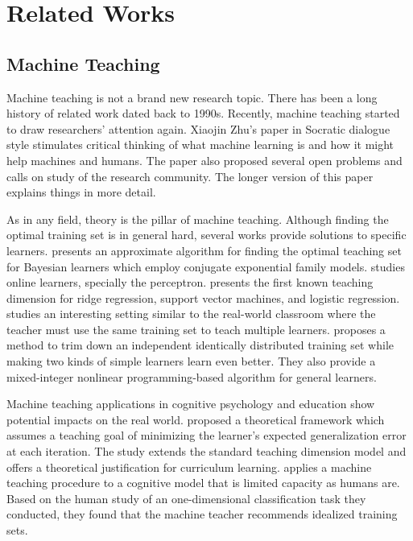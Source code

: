 
\chapter{Related Works}
\label{chap:related}


\section{Machine Teaching}

    Machine teaching is not a brand new research topic.
    There has been a long history of related work dated back to 1990s.
    Recently, machine teaching started to draw researchers' attention again.
    Xiaojin Zhu's paper in Socratic dialogue style \cite{Zhu2015} stimulates critical thinking of
    what machine learning is and how it might help machines and humans.
    The paper also proposed several open problems and calls on study of the research community.
    The longer version \cite{Zhu2018} of this paper explains things in more detail.

    As in any field, theory is the pillar of machine teaching.
    Although finding the optimal training set is in general hard,
    several works provide solutions to specific learners.
    \textcite{zhu2013machine} presents an approximate algorithm for finding the optimal teaching set
    for Bayesian learners which employ conjugate exponential family models.
    \textcite{xuezhou_zhang_optimal_2016} studies online learners, specially the perceptron.
    \textcite{liu2016teaching} presents the first known teaching dimension for ridge regression,
    support vector machines, and logistic regression.
    \textcite{zhu2017no} studies an interesting setting similar to the real-world classroom
    where the teacher must use the same training set to teach multiple learners.
    \textcite{ma2018teacher} proposes a method to trim down an independent identically distributed training set
    while making two kinds of simple learners learn even better.
    They also provide a mixed-integer nonlinear programming-based algorithm for general learners.

    Machine teaching applications in cognitive psychology and education show potential impacts on the real world.
    \textcite{khan2011humans} proposed a theoretical framework which assumes a teaching goal of
    minimizing the learner's expected generalization error at each iteration.
    The study extends the standard teaching dimension model and
    offers a theoretical justification for curriculum learning.
    \textcite{Patil2014} applies a machine teaching procedure
    to a cognitive model that is limited capacity as humans are.
    Based on the human study of an one-dimensional classification task they conducted,
    they found that the machine teacher recommends idealized training sets.

